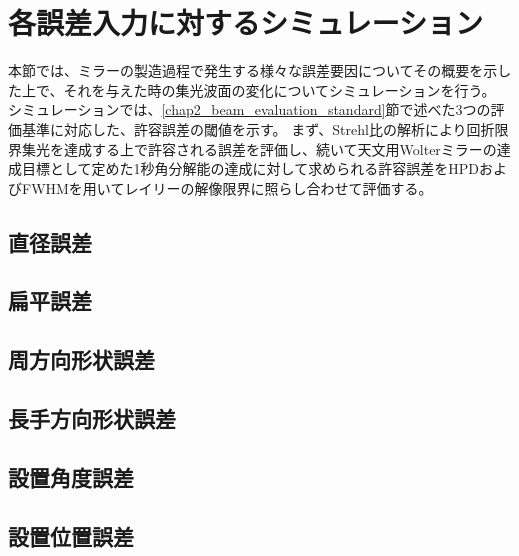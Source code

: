 \clearpage
\newpage

\section{各誤差入力に対するシミュレーション}
\label{chap2_simulation_error_response}

本節では、ミラーの製造過程で発生する様々な誤差要因についてその概要を示した上で、それを与えた時の集光波面の変化についてシミュレーションを行う。
シミュレーションでは、\ref{chap2_beam_evaluation_standard}節で述べた3つの評価基準に対応した、許容誤差の閾値を示す。
まず、Strehl比の解析により回折限界集光を達成する上で許容される誤差を評価し、続いて天文用Wolterミラーの達成目標として定めた1秒角分解能の達成に対して求められる許容誤差をHPDおよびFWHMを用いてレイリーの解像限界に照らし合わせて評価する。

\subsection{直径誤差}

\subsection{扁平誤差}

\subsection{周方向形状誤差}

\subsection{長手方向形状誤差}

\subsection{設置角度誤差}

\subsection{設置位置誤差}


\clearpage
\newpage


\clearpage
\newpage

